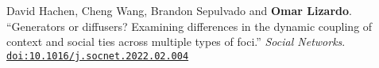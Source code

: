 

\ind David Hachen, Cheng Wang, Brandon Sepulvado and {\bf Omar Lizardo}. ``Generators or diffusers? Examining differences in the dynamic coupling of context and social ties across multiple types of foci.'' {\em Social Networks}. \href{https://doi.org/10.1016/j.socnet.2022.02.004}{\nolinkurl{doi:10.1016/j.socnet.2022.02.004}}
